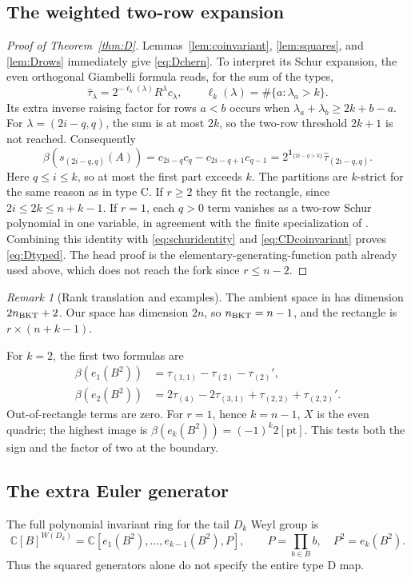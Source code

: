 \documentclass[11pt,letterpaper]{article}
\theoremstyle{remark}
\newtheorem{remark}[theorem]{Remark}
\newcommand{\wtau}{\widehat{\tau}}
\newcommand{\ellk}{\ell_k}
\newcommand{\ind}{\mathbf{1}}
\newcommand{\C}{\mathbb C}
\begin{document}
\subsection{The weighted two-row expansion}
\begin{proof}[Proof of Theorem~\ref{thm:D}]
Lemmas~\ref{lem:coinvariant}, \ref{lem:squares}, and \ref{lem:Drows} immediately give \eqref{eq:Dchern}. To interpret its Schur expansion, the even orthogonal Giambelli formula \cite[Theorem 1]{BKTeven} reads, for the sum of the types,
\[
 \wtau_\lambda=2^{-\ellk(\lambda)}R^\lambda c_\lambda,
 \qquad \ellk(\lambda)=\#\{a:\lambda_a>k\}.
\]
Its extra inverse raising factor for rows $a<b$ occurs when $\lambda_a+\lambda_b\geq2k+b-a$. For $\lambda=(2i-q,q)$, the sum is at most $2k$, so the two-row threshold $2k+1$ is not reached. Consequently
\[
 \beta(s_{(2i-q,q)}(A))
 =c_{2i-q}c_q-c_{2i-q+1}c_{q-1}
 =2^{\ind_{\{2i-q>k\}}}\wtau_{(2i-q,q)}.
\]
Here $q\leq i\leq k$, so at most the first part exceeds $k$. The partitions are $k$-strict for the same reason as in type C. If $r\geq2$ they fit the rectangle, since $2i\leq2k\leq n+k-1$. If $r=1$, each $q>0$ term vanishes as a two-row Schur polynomial in one variable, in agreement with the finite specialization of \cite[Theorem 4]{BKTeven}. Combining this identity with \eqref{eq:schuridentity} and \eqref{eq:CDcoinvariant} proves \eqref{eq:Dtyped}. The head proof is the elementary-generating-function path already used above, which does not reach the fork since $r\leq n-2$.
\end{proof}

\begin{remark}[Rank translation and examples]
The ambient space in \cite{BKTeven} has dimension $2n_{\rm BKT}+2$. Our space has dimension $2n$, so $n_{\rm BKT}=n-1$, and the rectangle is $r\times(n+k-1)$.

For $k=2$, the first two formulas are
\begin{align*}
 \beta(e_1(B^2))&=\tau_{(1,1)}-\tau_{(2)}-\tau_{(2)}',\\
 \beta(e_2(B^2))&=2\tau_{(4)}-2\tau_{(3,1)}
                        +\tau_{(2,2)}+\tau_{(2,2)}'.
\end{align*}
Out-of-rectangle terms are zero. For $r=1$, hence $k=n-1$, $X$ is the even quadric; the highest image is $\beta(e_k(B^2))=(-1)^k2[\mathrm{pt}]$. This tests both the sign and the factor of two at the boundary.
\end{remark}

\subsection{The extra Euler generator}
The full polynomial invariant ring for the tail $D_k$ Weyl group is
\begin{equation}
 \C[B]^{W(D_k)}=\C[e_1(B^2),\ldots,e_{k-1}(B^2),P],
 \qquad P=\prod_{b\in B}b,\quad P^2=e_k(B^2).
 \label{eq:Dinvariants}
\end{equation}
Thus the squared generators alone do not specify the entire type D map.
\end{document}
